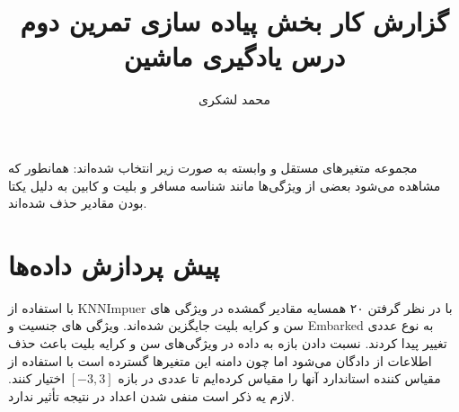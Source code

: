 \documentclass[11pt]{article}
\title{گزارش کار بخش پیاده سازی تمرین دوم درس یادگیری ماشین}
\author{محمد لشکری}
\begin{document}
	\maketitle
مجموعه متغیر‌های مستقل و وابسته به صورت زیر انتخاب شده‌اند:
همانطور که مشاهده می‌شود بعضی از ویژگی‌ها مانند شناسه مسافر و بلیت و کابین به دلیل یکتا بودن مقادیر حذف شده‌اند.
\section{پیش پردازش داده‌ها}\label{preprocessing}
با استفاده از
{\Consolas KNNImpuer}
با در نظر گرفتن ۲۰ همسایه مقادیر گمشده در ویژگی های سن و کرایه بلیت جایگزین شده‌اند. ویژگی های جنسیت و 
{\Consolas Embarked}
به نوع عددی تغییر پیدا کردند. نسبت دادن بازه به داده در ویژگی‌های سن و کرایه بلیت باعث حذف اطلاعات از دادگان می‌شود اما چون دامنه این متغیر‌ها گسترده است با استفاده از مقیاس کننده استاندارد آنها را مقیاس کرده‌ایم تا عددی در بازه 
$\left[-3,3\right]$
اختیار کنند. لازم یه ذکر است منفی شدن اعداد در نتیجه تأثیر ندارد.
\end{document}
